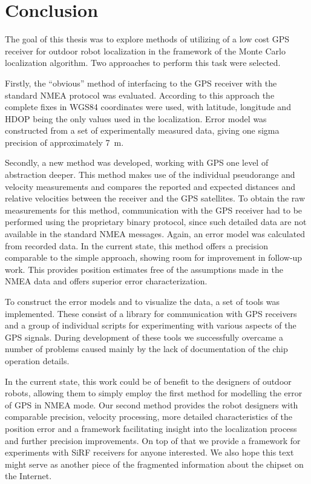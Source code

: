 \chapter{Conclusion}
\label{chap:conclusion}

The goal of this thesis was to explore methods of utilizing of a low cost GPS receiver
for outdoor robot localization in the framework of the Monte Carlo localization algorithm.
Two approaches to perform this task were selected.

Firstly, the \enquote{obvious} method of interfacing to the GPS receiver with the
standard NMEA protocol was evaluated.
According to this approach the complete fixes in WGS84 coordinates were used,
with latitude, longitude and HDOP being the only values used in the localization.
Error model was constructed from a set of experimentally measured data,
giving one sigma precision of approximately \SI{7}{\meter}.

Secondly, a new method was developed, working with GPS one level of abstraction deeper.
This method makes use of the individual pseudorange and velocity measurements
and compares the reported and expected distances and relative velocities between
the receiver and the GPS satellites.
To obtain the raw measurements for this method, communication with the GPS
receiver had to be performed using the proprietary binary protocol,
since such detailed data are not available in the standard NMEA messages.
Again, an error model was calculated from recorded data.
In the current state, this method offers a precision comparable to the simple
approach, showing room for improvement in follow-up work.
This provides position estimates free of the assumptions made in the NMEA data
and offers superior error characterization.

To construct the error models and to visualize the data, a set of tools was implemented.
These consist of a library for communication with \sirf GPS receivers
and a group of individual scripts for experimenting with various aspects of the GPS signals.
During development of these tools we successfully overcame a number of problems caused mainly
by the lack of documentation of the \sirf chip operation details.

In the current state, this work could be of benefit to the designers of
outdoor robots, allowing them to simply employ the first method for modelling the
error of GPS in NMEA mode.
Our second method provides the robot designers with comparable precision,
velocity processing, more detailed characteristics of the position error
and a framework facilitating insight into the localization process and further
precision improvements.
On top of that we provide a framework for experiments with SiRF receivers
for anyone interested.
We also hope this text might serve as another piece of the fragmented
information about the \sirf chipset on the Internet.
